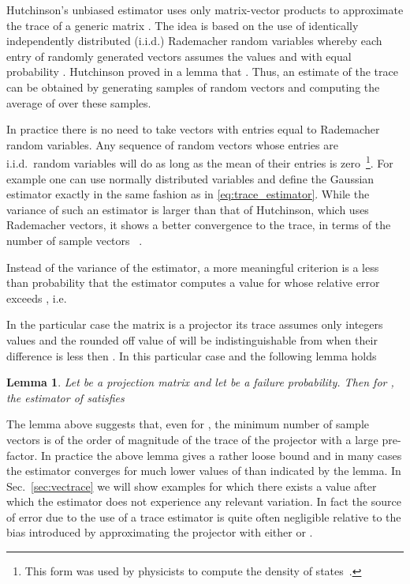 \documentclass[12pt]{article}		\usepackage{tabls,multirow}
\newtheorem{lemma}{Lemma}[section]
\begin{document}
Hutchinson's unbiased estimator uses only matrix-vector products to
approximate the trace of a generic matrix .  The idea is based on
the use of identically independently distributed (i.i.d.) Rademacher
random variables whereby each entry of randomly generated vectors 
assumes the values  and  with equal probability .
Hutchinson proved in a lemma that .  Thus,
an estimate  of the trace  can be obtained by
generating  samples of random vectors  and
computing the average of  over these samples.




In practice there is no need to take vectors with entries equal to
Rademacher random variables. Any sequence of random vectors 
whose entries are i.i.d.~random variables will do as long as the mean
of their entries is zero~\cite{Bekas-al-DIAGEST}\footnote{This form
  was used by physicists to compute the density of
  states~\cite{SilverRoederAl,Wang-DOS,Roder-al-96,SilverRoder1994}.}.
For example one can use normally distributed variables and define the
Gaussian estimator exactly in the same fashion as in
\eqref{eq:trace_estimator}. While the variance of such an estimator is
larger than that of Hutchinson, which uses Rademacher vectors, it
shows a better convergence to the trace, in terms of the number of
sample vectors ~\cite{Avron:2011hg}.

Instead of the variance of the estimator, a more meaningful criterion
is a less than  probability that the estimator computes a
value  for  whose relative error exceeds
, i.e.

In the particular case the matrix  is a projector  its trace
assumes only integers values and the rounded off value of
 will be indistinguishable from  when
their difference is less then . In this particular case
 and the following lemma
holds~\cite{Avron:2011hg}
\begin{lemma}
\label{th:toledo}
Let be  a projection matrix and let  be a failure probability. Then for , the estimator  of  satisfies

\end{lemma}

The lemma above suggests that, even for , the minimum
number of sample vectors is of the order of magnitude of the trace of
the projector with a large pre-factor. In practice the above lemma
gives a rather loose bound and in many cases the estimator
 converges for much lower values of  than
indicated by the lemma. In Sec.~\ref{sec:vectrace} we will show
examples for which there exists a value  after which
the estimator  does not experience any relevant
variation. In fact the source of error due to the use of a trace
estimator is quite often negligible relative to  the bias
introduced by approximating the projector  with either
 or .
\end{document}
